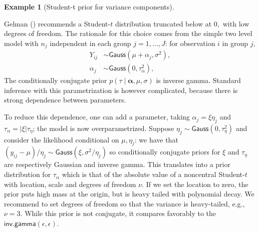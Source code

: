 \documentclass[
  11pt,
  letterpaper,
]{scrbook}
\theoremstyle{definition}
\newtheorem{example}{Example}[chapter]
\theoremstyle{plain}
\theoremstyle{plain}
\theoremstyle{plain}
\theoremstyle{definition}
\theoremstyle{definition}
\theoremstyle{plain}
\theoremstyle{plain}
\theoremstyle{remark}
\begin{document}
\begin{example}[Student-t prior for variance
components]\protect\hypertarget{exm-random-effect-variance}{}\label{exm-random-effect-variance}

Gelman () recommends a Student-\(t\)
distribution truncated below at \(0,\) with low degrees of freedom. The
rationale for this choice comes from the simple two level model with
\(n_j\) independent in each group \(j=1, \ldots, J\): for observation
\(i\) in group \(j,\) \begin{align*}
Y_{ij} &\sim \mathsf{Gauss}(\mu + \alpha_j, \sigma^2),\\
\alpha_j &\sim \mathsf{Gauss}(0, \tau^2_\alpha),
\end{align*} The conditionally conjugate prior
\(p(\tau \mid \boldsymbol{\alpha}, \mu, \sigma)\) is inverse gamma.
Standard inference with this parametrization is however complicated,
because there is strong dependence between parameters.

To reduce this dependence, one can add a parameter, taking
\(\alpha_j = \xi \eta_j\) and \(\tau_\alpha=|\xi|\tau_{\eta}\); the
model is now overparametrized. Suppose
\(\eta_j \sim \mathsf{Gauss}(0, \tau^2_\eta)\) and consider the
likelihood conditional on \(\mu, \eta_j\): we have that
\((y_{ij} - \mu)/\eta_j \sim \mathsf{Gauss}(\xi, \sigma^2/\eta_j)\) so
conditionally conjugate priors for \(\xi\) and \(\tau_\eta\) are
respectively Gaussian and inverse gamma. This translates into a prior
distribution for \(\tau_\alpha\) which is that of the absolute value of
a noncentral Student-\(t\) with location, scale and degrees of freedom
\(\nu.\) If we set the location to zero, the prior puts high mass at the
origin, but is heavy tailed with polynomial decay. We recommend to set
degrees of freedom so that the variance is heavy-tailed, e.g.,
\(\nu=3.\) While this prior is not conjugate, it compares favorably to
the \(\mathsf{inv. gamma}(\epsilon, \epsilon).\)

\end{example}
\end{document}
